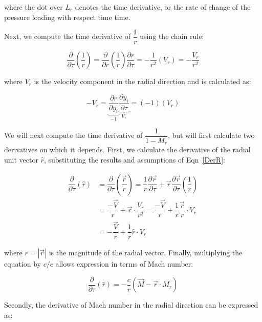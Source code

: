 \documentclass[]{aiaa-tc}%
\begin{document}
\noindent where the dot over $L_r$ denotes the time derivative, or the rate of change of the pressure loading with respect time time.

Next, we compute the time derivative of $\dfrac{1}{r}$ using the chain rule:

\begin{equation} \label{DerR}
\dfrac{\partial}{\partial\tau} \left( \dfrac{1}{r} \right)
= \dfrac{\partial}{\partial r} \left( \dfrac{1}{r} \right)
    \dfrac{\partial r}{\partial\tau}
= -\dfrac{1}{r^2} (V_r)
= -\dfrac{V_r}{r^2}
\end{equation}

\noindent where $V_r$ is the velocity component in the radial direction and is calculated as:

\begin{equation} \label{Vr}
-V_r = \underbrace{\dfrac{\partial r}{\partial y_i}}_{-1}
    \underbrace{\dfrac{\partial y_i}{\partial \tau}}_{V_r}
= (-1) (V_r)
\end{equation}

We will next compute the time derivative of $\dfrac{1}{1 - M_r}$, but will first calculate two derivatives on which it depends.  First, we calculate the derivative of the radial unit vector $\hat{r}$, substituting the results and assumptions of Eqn~\ref{DerR}:

\begin{align*}
\dfrac{\partial}{\partial\tau} \left( \hat{r} \right)
&= \dfrac{\partial}{\partial\tau} \left( \dfrac{\vec{r}}{r} \right)
    = \dfrac{1}{r} \dfrac{\partial \vec{r}}{\partial\tau}
    + \vec{r}\dfrac{\partial\vec{r}}{\partial\tau} \left(\dfrac{1}{r} \right)\\
&= \dfrac{-\vec{V}}{r} + \vec{r} \cdot \dfrac{V_r}{r^2}
    = \dfrac{-\vec{V}}{r} + \dfrac{1}{r} \dfrac{\vec{r}}{r} \cdot V_r \\
&= -\dfrac{\vec{V}}{r} + \dfrac{1}{r} \hat{r} \cdot V_r
\end{align*}

\noindent where $r = |\vec{r}|$ is the magnitude of the radial vector.  Finally, multiplying the equation by $c/c$ allows expression in terms of Mach number:

\begin{equation} \label{DerRhat}
\dfrac{\partial}{\partial\tau} \left( \hat{r} \right)
= -\dfrac{c}{r} \left( \vec{M} - \vec{r} \cdot M_r \right)
\end{equation}


Secondly, the derivative of Mach number in the radial direction can be expressed as:
\end{document}
